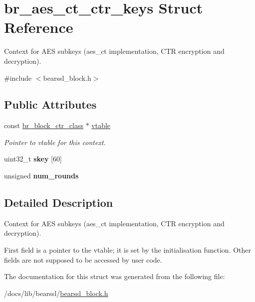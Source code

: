 \hypertarget{structbr__aes__ct__ctr__keys}{}\section{br\+\_\+aes\+\_\+ct\+\_\+ctr\+\_\+keys Struct Reference}
\label{structbr__aes__ct__ctr__keys}


Context for A\+ES subkeys ({\ttfamily aes\+\_\+ct} implementation, C\+TR encryption and decryption).  




{\ttfamily \#include $<$bearssl\+\_\+block.\+h$>$}

\subsection*{Public Attributes}
\begin{DoxyCompactItemize}
\item 
\mbox{\label{structbr__aes__ct__ctr__keys_af1bb322ecd571a1a99529ceac021775f}} 
const \hyperlink{bearssl__block_8h_a8934ac58af503220bfb6e6cbc2cfb209}{br\+\_\+block\+\_\+ctr\+\_\+class} $\ast$ \hyperlink{structbr__aes__ct__ctr__keys_af1bb322ecd571a1a99529ceac021775f}{vtable}
\begin{DoxyCompactList}\small\item\em Pointer to vtable for this context. \end{DoxyCompactList}\item 
\mbox{\label{structbr__aes__ct__ctr__keys_accd7fdfc8f750cb9db05dfe3cefd593e}} 
uint32\+\_\+t {\bfseries skey} \mbox{[}60\mbox{]}
\item 
\mbox{\label{structbr__aes__ct__ctr__keys_a350a40e14a23515e073aeccf18e4580a}} 
unsigned {\bfseries num\+\_\+rounds}
\end{DoxyCompactItemize}


\subsection{Detailed Description}
Context for A\+ES subkeys ({\ttfamily aes\+\_\+ct} implementation, C\+TR encryption and decryption). 

First field is a pointer to the vtable; it is set by the initialisation function. Other fields are not supposed to be accessed by user code. 

The documentation for this struct was generated from the following file\+:\begin{DoxyCompactItemize}
\item 
/docs/lib/bearssl/\hyperlink{bearssl__block_8h}{bearssl\+\_\+block.\+h}\end{DoxyCompactItemize}
